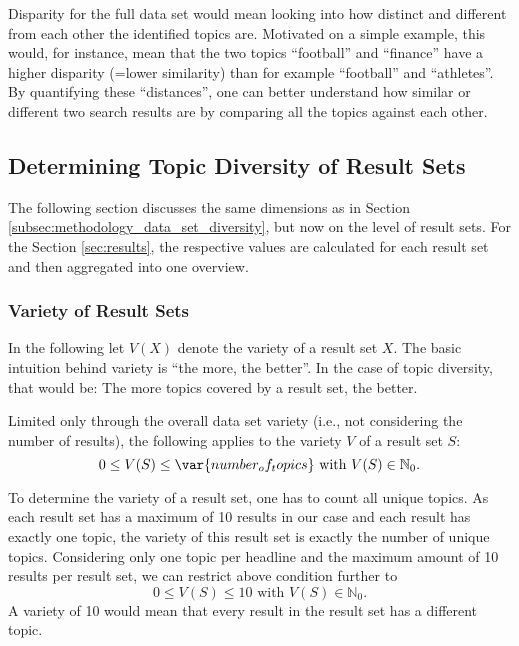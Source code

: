 Disparity for the full data set would mean looking into how distinct and different from each other the identified topics are. Motivated on a simple example, this would, for instance, mean that the two topics ``football'' and ``finance'' have a higher disparity (=lower similarity) than for example ``football'' and ``athletes''. By quantifying these ``distances'', one can better understand how similar or different two search results are by comparing all the topics against each other.


\subsection{Determining Topic Diversity of Result Sets}
\label{subsec:methodology_result_set_diversity}

The following section discusses the same dimensions as in Section \ref{subsec:methodology_data_set_diversity}, but now on the level of result sets. For the Section \ref{sec:results}, the respective values are calculated for each result set and then aggregated into one overview.

\subsubsection{Variety of Result Sets} In the following let $V(X)$ denote the variety of a result set $X$. The basic intuition behind variety is ``the more, the better''. In the case of topic diversity, that would be: The more topics covered by a result set, the better. 

Limited only through the overall data set variety (i.e., not considering the number of results), the following applies to the variety $V$ of a result set $S$:
\[
    0 \leq V(S) \leq \var{number_of_topics} \text{ with } V(S) \in \mathbb{N}_0\text{.}
\]


To determine the variety of a result set, one has to count all unique topics. 
As each result set has a maximum of 10 results in our case and each result has exactly one topic, the variety of this result set is exactly the number of unique topics. Considering only one topic per headline and the maximum amount of 10 results per result set, we can restrict above condition further to
\[
    0 \leq V(S) \leq 10 \text{ with } V(S) \in \mathbb{N}_0\text{.}
\]
A variety of 10 would mean that every result in the result set has a different topic.

